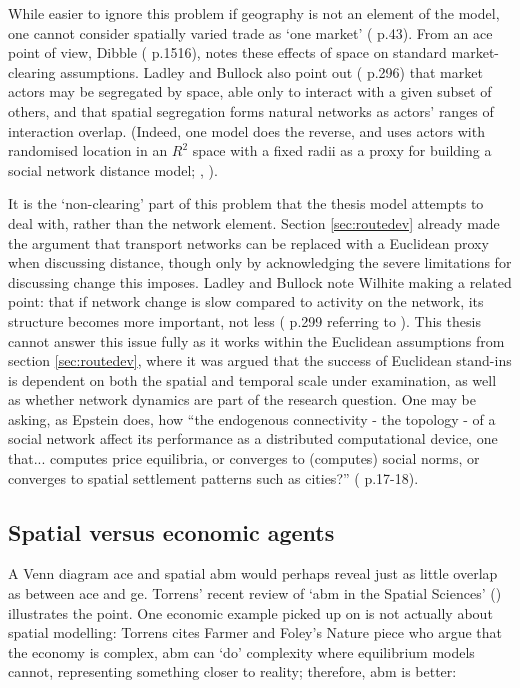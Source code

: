 While easier to ignore this problem if geography is not an element of the model, one cannot consider spatially varied trade as `one market' (\citealt{isard_location_1956} p.43). From an \gls{ace} point of view, Dibble (\citeyear{dibble_computational_2006} p.1516), notes these effects of space on standard market-clearing assumptions. Ladley and Bullock also point out (\citealt{ladley_strategic_2008} p.296) that market actors may be segregated by space, able only to interact with a given subset of others, and that spatial segregation forms natural networks as actors' ranges of interaction overlap. (Indeed, one model does the reverse, and uses actors with randomised location in an $R^2$ space with a fixed radii as a proxy for building a social network distance model; \citealt{hamill_social_2009}, \citeyear{hamill_simulating_2010}). 

It is the `non-clearing' part of this problem that the thesis model attempts to deal with, rather than the network element. Section \ref{sec:routedev} already made the argument that transport networks can be replaced with a Euclidean proxy when discussing distance, though only by acknowledging the severe limitations for discussing change this imposes. Ladley and Bullock note Wilhite making a related point: that if network change is slow compared to activity on the network, its structure becomes more important, not less (\citealt{ladley_strategic_2008} p.299 referring to \citealt{wilhite_economic_2006}). This thesis cannot answer this issue fully as it works within the Euclidean assumptions from section \ref{sec:routedev}, where it was argued that the success of Euclidean stand-ins is dependent on both the spatial and temporal scale under examination, as well as whether network dynamics are part of the research question. One may be asking, as Epstein does, how ``the endogenous connectivity - the topology - of a social network affect its performance as a distributed computational device, one that... computes price equilibria, or converges to (computes) social norms, or converges to spatial settlement patterns such as cities?'' (\citealt{epstein_generative_2006} p.17-18). 

\subsection{Spatial versus economic agents}

A Venn diagram \gls{ace} and spatial \gls{abm} would perhaps reveal just as little overlap as between \gls{ace} and \gls{ge}.  Torrens' recent review of `\gls{abm} in the Spatial Sciences' (\citeyear{torrens_agent-based_2010}) illustrates the point. One economic example picked up on is not actually about spatial modelling: Torrens cites Farmer and Foley's Nature piece who argue that the economy is complex, \gls{abm} can `do' complexity where equilibrium models cannot, representing something closer to reality; therefore, \gls{abm} is better:


